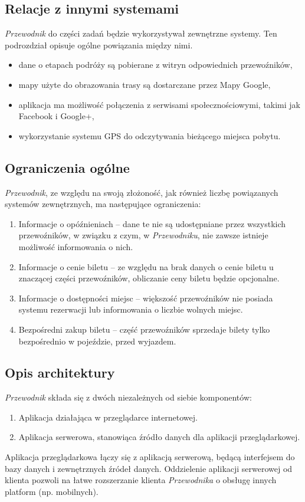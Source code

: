 \documentclass[12pt,a4paper]{report}
\begin{document}
\subsection{Relacje z innymi systemami}
	\emph{Przewodnik} do części zadań będzie wykorzystywał zewnętrzne systemy. Ten podrozdział opisuje ogólne powiązania między nimi.
\begin{itemize}
	\item dane o etapach podróży są pobierane z witryn odpowiednich przewoźników,
	\item mapy użyte do obrazowania trasy są dostarczane przez Mapy Google,
	\item aplikacja ma możliwość połączenia z serwisami społecznościowymi, takimi jak Facebook i Google+,
	\item wykorzystanie systemu GPS do odczytywania bieżącego miejsca pobytu.
\end{itemize}
\newpage
\subsection{Ograniczenia ogólne}
	\emph{Przewodnik}, ze względu na swoją złożoność, jak również liczbę powiązanych systemów zewnętrznych, ma następujące ograniczenia:	
\begin{enumerate}
	\item Informacje o opóźnieniach -- dane te nie są udostępniane przez wszystkich przewoźników, w związku z czym, w \emph{Przewodniku}, nie zawsze istnieje możliwość informowania o nich.
	\item Informacje o cenie biletu -- ze względu na brak danych o cenie biletu u znaczącej części przewoźników, obliczanie ceny biletu będzie opcjonalne.
	\item Informacje o dostępności miejsc -- większość przewoźników nie posiada systemu rezerwacji lub informowania o liczbie wolnych miejsc.
	\item Bezpośredni zakup biletu -- część przewoźników sprzedaje bilety tylko bezpośrednio w pojeździe, przed wyjazdem.
\end{enumerate}
\subsection{Opis architektury}
\emph{Przewodnik} składa się z dwóch niezależnych od siebie komponentów:
\begin{enumerate}
	\item Aplikacja działająca w przeglądarce internetowej.
	\item Aplikacja serwerowa, stanowiąca źródło danych dla aplikacji przeglądarkowej.
\end{enumerate} 
	Aplikacja przeglądarkowa łączy się z aplikacją serwerową, będącą interfejsem do bazy danych i zewnętrznych źródeł danych. Oddzielenie aplikacji serwerowej od klienta pozwoli na łatwe rozszerzanie klienta \emph{Przewodnika} o obsługę innych platform (np. mobilnych).
\end{document}
